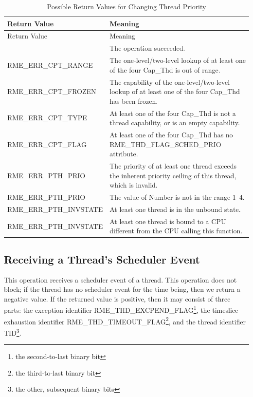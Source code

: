 \begin{xltabular}{\textwidth}{@{}>{\hsize\raggedright\arraybackslash}X>{\hsize\raggedright\arraybackslash}X@{}}
\caption{Possible Return Values for Changing Thread Priority}\label{tab:4-31-change-thread-priority-return-values}\\
\toprule
Return Value & Meaning\tabularnewline
\endfirsthead
\toprule
Return Value & Meaning\tabularnewline
\midrule
\endhead
\bottomrule
{} & The operation succeeded.\tabularnewline
    RME\_ERR\_CPT\_RANGE & The one-level/two-level lookup of at least one of the four Cap\_Thd is out of range.\tabularnewline
    RME\_ERR\_CPT\_FROZEN & The capability of the one-level/two-level lookup of at least one of the four Cap\_Thd has been frozen.\tabularnewline
    RME\_ERR\_CPT\_TYPE & At least one of the four Cap\_Thd is not a thread capability, or is an empty capability.\tabularnewline
    RME\_ERR\_CPT\_FLAG & At least one of the four Cap\_Thd has no RME\_THD\_FLAG\_SCHED\_PRIO attribute.\tabularnewline
    RME\_ERR\_PTH\_PRIO & The priority of at least one thread exceeds the inherent priority ceiling of this thread, which is invalid.\tabularnewline
    RME\_ERR\_PTH\_PRIO & The value of Number is not in the range 1~4.\tabularnewline
    RME\_ERR\_PTH\_INVSTATE & At least one thread is in the unbound state.\tabularnewline
    RME\_ERR\_PTH\_INVSTATE & At least one thread is bound to a CPU different from the CPU calling this function.\tabularnewline
\end{xltabular}
\nopagebreak[4]

\subsection{Receiving a Thread's Scheduler Event}\label{subsec:4-receive-thread-scheduler-event}
\nopagebreak[4]

This operation receives a scheduler event of a thread. This operation does not block; if the thread has no scheduler event for the time being, then we return a negative value. If the returned value is positive, then it may consist of three parts: the exception identifier RME\_THD\_EXCPEND\_FLAG\footnote{the second-to-last binary bit}, the timeslice exhaustion identifier RME\_THD\_TIMEOUT\_FLAG\footnote{the third-to-last binary bit}, and the thread identifier TID\footnote{the other, subsequent binary bits}.

